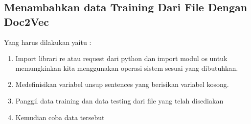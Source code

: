 \subsection{Menambahkan data Training Dari File Dengan Doc2Vec}
Yang harus dilakukan yaitu :
\begin{enumerate}
\item Import librari re atau request dari python dan import modul os untuk memungkinkan kita menggunakan operasi sistem sesuai yang dibutuhkan.
\item Medefinisikan variabel unsup sentences yang berisikan variabel kosong.
\item Panggil data training dan data testing dari file yang telah disediakan
\item Kemudian coba data tersebut
\end{enumerate}

